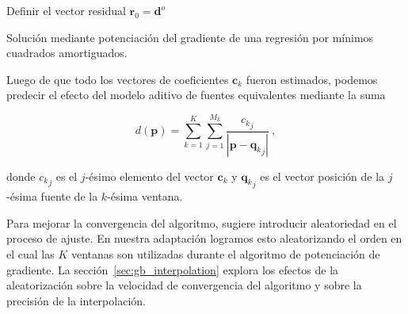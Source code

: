 \begin{algorithm}[!h]
  \DontPrintSemicolon
  \linespread{1.5}\selectfont
  Definir el vector residual $\mathbf{r}_{0} = \mathbf{d}^o$ \;
  \BlankLine
  \linespread{1}\selectfont
  \caption{
      Solución mediante potenciación del gradiente de una regresión por mínimos
      cuadrados amortiguados.
  }
  \label{alg:gradient_boosting}
\end{algorithm}

Luego de que todo los vectores de coeficientes $\mathbf{c}_k$ fueron estimados,
podemos predecir el efecto del modelo aditivo de fuentes equivalentes mediante
la suma

\begin{equation}
    d(\mathbf{p}) =
    \sum\limits_{k=1}^K \sum\limits_{j=1}^{M_k}
    \frac{{c_k}_j}{| \mathbf{p} - {\mathbf{q}_k}_j |}
    \ ,
    \label{eq:eql-forward-gb}
\end{equation}

\noindent donde ${c_k}_j$ es el $j$-ésimo elemento del vector $\mathbf{c}_k$
y ${\mathbf{q}_k}_j$ es el vector posición de la $j$-ésima fuente de la
$k$-ésima ventana.

Para mejorar la convergencia del algoritmo, \citet{friedman2002} sugiere
introducir aleatoriedad en el proceso de ajuste.
En nuestra adaptación logramos esto aleatorizando el orden en el cual las $K$
ventanas son utilizadas durante el algoritmo de potenciación de gradiente.
La sección~\ref{sec:gb_interpolation} explora los efectos de la aleatorización
sobre la velocidad de convergencia del algoritmo y sobre la precisión de la
interpolación.

